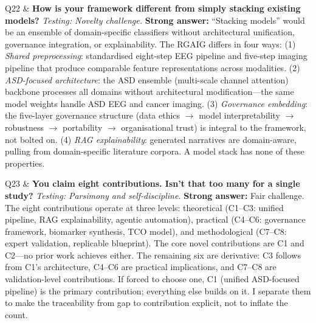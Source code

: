 \begin{xltabular}
Q22 & \textbf{How is your framework different from simply stacking existing models?} \newline
\textit{Testing: Novelty challenge.} \newline\newline
\textbf{Strong answer:} ``Stacking models'' would be an ensemble of domain-specific classifiers without architectural unification, governance integration, or explainability. The RGAIG differs in four ways: (1) \textit{Shared preprocessing}: standardised eight-step EEG pipeline and five-step imaging pipeline that produce comparable feature representations across modalities. (2) \textit{ASD-focused architecture}: the ASD ensemble (multi-scale channel attention) backbone processes all domains without architectural modification---the same model weights handle ASD EEG and cancer imaging. (3) \textit{Governance embedding}: the five-layer governance structure (data ethics $\rightarrow$ model interpretability $\rightarrow$ robustness $\rightarrow$ portability $\rightarrow$ organisational trust) is integral to the framework, not bolted on. (4) \textit{RAG explainability}: generated narratives are domain-aware, pulling from domain-specific literature corpora. A model stack has none of these properties. \\
\addlinespace

Q23 & \textbf{You claim eight contributions. Isn't that too many for a single study?} \newline
\textit{Testing: Parsimony and self-discipline.} \newline\newline
\textbf{Strong answer:} Fair challenge. The eight contributions operate at three levels: theoretical (C1--C3: unified pipeline, RAG explainability, agentic automation), practical (C4--C6: governance framework, biomarker synthesis, TCO model), and methodological (C7--C8: expert validation, replicable blueprint). The core novel contributions are C1 and C2---no prior work achieves either. The remaining six are derivative: C3 follows from C1's architecture, C4--C6 are practical implications, and C7--C8 are validation-level contributions. If forced to choose one, C1 (unified ASD-focused pipeline) is the primary contribution; everything else builds on it. I separate them to make the traceability from gap to contribution explicit, not to inflate the count. \\
\addlinespace


\end{xltabular}
